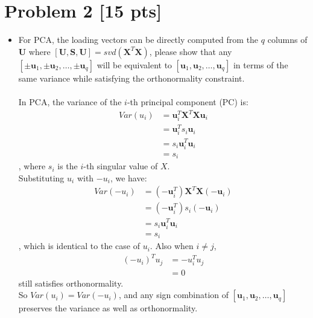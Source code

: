\documentclass[11pt]{article}
\newcommand{\mtx}[1]{\mathbf{#1}}
\newcommand{\vct}[1]{\mathbf{#1}}
\def \mU {\mtx{U}}
\def \mS {\mtx{S}}
\def \mX {\mtx{X}}
\def \vu {\vct{u}}
\begin{document}
\section*{Problem 2 [15 pts]}
\begin{itemize}
	\item For PCA, the loading vectors can be directly computed from the $q$ columns of  $\mU$ where  $[\mU,\mS,\mU]=svd(\mX^T\mX)$, please show that any $[\pm\vu_1,\pm\vu_2,\dots,\pm\vu_q]$ will be equivalent to $[\vu_1,\vu_2,\dots,\vu_q]$ in terms of the same variance while satisfying the orthonormality constraint.\\ \\
	In PCA, the variance of the $i$-th principal component (PC) is: 
	\begin{equation}
		\begin{aligned}
			Var(u_i)&=\vu_i^T \mX^T\mX \vu_i \\
			&= \vu_i^Ts_i\vu_i\\
			&= s_i\vu_i^T\vu_i\\
			&= s_i
		\end{aligned}
	\end{equation}
	, where $s_i$ is the $i$-th singular value of $X$.\\
	Substituting $u_i$ with $-u_i$, we have:
	\begin{equation}
		\begin{aligned}
			Var(-u_i)&=(-\vu_i^T) \mX^T\mX (-\vu_i) \\
			&= (-\vu_i^T) s_i (-\vu_i)\\
			&= s_i\vu_i^T\vu_i\\
			&= s_i
		\end{aligned}
	\end{equation}
	, which is identical to the case of $u_i$.
	Also when $i\neq j$,
	\begin{equation}
		\begin{aligned}
			(-u_i)^Tu_j&=-u_i^Tu_j\\
			&=0
		\end{aligned}
	\end{equation}
	still satisfies orthonormality. \\
	So $Var(u_i)=Var(-u_i)$, and any sign combination of $[\vu_1,\vu_2,\dots,\vu_q]$ preserves the variance as well as orthonormality.
	

\end{itemize}
\end{document}
